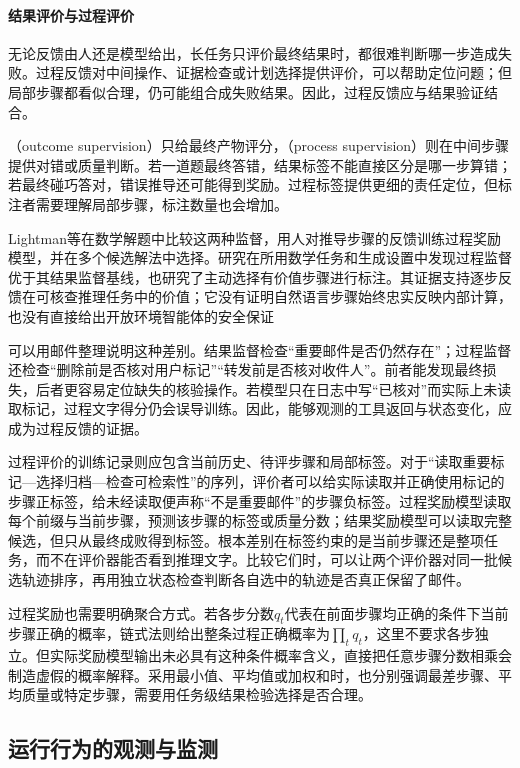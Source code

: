 \paragraph{结果评价与过程评价}

无论反馈由人还是模型给出，长任务只评价最终结果时，都很难判断哪一步造成失败。过程反馈对中间操作、证据检查或计划选择提供评价，可以帮助定位问题；但局部步骤都看似合理，仍可能组合成失败结果。因此，过程反馈应与结果验证结合。

（outcome supervision）只给最终产物评分，（process supervision）则在中间步骤提供对错或质量判断。若一道题最终答错，结果标签不能直接区分是哪一步算错；若最终碰巧答对，错误推导还可能得到奖励。过程标签提供更细的责任定位，但标注者需要理解局部步骤，标注数量也会增加。

Lightman等在数学解题中比较这两种监督，用人对推导步骤的反馈训练过程奖励模型，并在多个候选解法中选择。研究在所用数学任务和生成设置中发现过程监督优于其结果监督基线，也研究了主动选择有价值步骤进行标注。其证据支持逐步反馈在可核查推理任务中的价值；它没有证明自然语言步骤始终忠实反映内部计算，也没有直接给出开放环境智能体的安全保证

可以用邮件整理说明这种差别。结果监督检查“重要邮件是否仍然存在”；过程监督还检查“删除前是否核对用户标记”“转发前是否核对收件人”。前者能发现最终损失，后者更容易定位缺失的核验操作。若模型只在日志中写“已核对”而实际上未读取标记，过程文字得分仍会误导训练。因此，能够观测的工具返回与状态变化，应成为过程反馈的证据。

过程评价的训练记录则应包含当前历史、待评步骤和局部标签。对于“读取重要标记—选择归档—检查可检索性”的序列，评价者可以给实际读取并正确使用标记的步骤正标签，给未经读取便声称“不是重要邮件”的步骤负标签。过程奖励模型读取每个前缀与当前步骤，预测该步骤的标签或质量分数；结果奖励模型可以读取完整候选，但只从最终成败得到标签。根本差别在标签约束的是当前步骤还是整项任务，而不在评价器能否看到推理文字。比较它们时，可以让两个评价器对同一批候选轨迹排序，再用独立状态检查判断各自选中的轨迹是否真正保留了邮件。

过程奖励也需要明确聚合方式。若各步分数$q_t$代表在前面步骤均正确的条件下当前步骤正确的概率，链式法则给出整条过程正确概率为$\prod_tq_t$，这里不要求各步独立。但实际奖励模型输出未必具有这种条件概率含义，直接把任意步骤分数相乘会制造虚假的概率解释。采用最小值、平均值或加权和时，也分别强调最差步骤、平均质量或特定步骤，需要用任务级结果检验选择是否合理。

\subsection{运行行为的观测与监测}
\label{sec:alignment-oversight-information}

